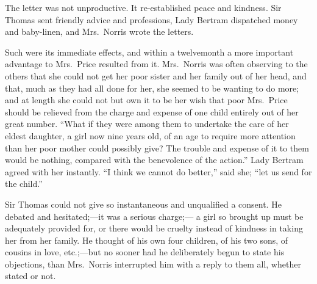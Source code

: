 The letter was not unproductive.  It re-established
peace and kindness.  Sir Thomas sent friendly
advice and professions, Lady Bertram dispatched
money and baby-linen, and Mrs.\ Norris wrote the letters.

Such were its immediate effects, and within a twelvemonth
a more important advantage to Mrs.\ Price resulted from it.
Mrs.\ Norris was often observing to the others that she
could not get her poor sister and her family out of
her head, and that, much as they had all done for her,
she seemed to be wanting to do more; and at length she
could not but own it to be her wish that poor Mrs.\ Price
should be relieved from the charge and expense of one child
entirely out of her great number.  ``What if they were
among them to undertake the care of her eldest daughter,
a girl now nine years old, of an age to require more
attention than her poor mother could possibly give?
The trouble and expense of it to them would be nothing,
compared with the benevolence of the action.''  Lady Bertram
agreed with her instantly.  ``I think we cannot do better,''
said she; ``let us send for the child.''

Sir Thomas could not give so instantaneous and unqualified
a consent.  He debated and hesitated;---it was a serious charge;---%
a girl so brought up must be adequately provided for,
or there would be cruelty instead of kindness in taking
her from her family.  He thought of his own four children,
of his two sons, of cousins in love, etc.;---but no sooner
had he deliberately begun to state his objections,
than Mrs.\ Norris interrupted him with a reply to them all,
whether stated or not.


